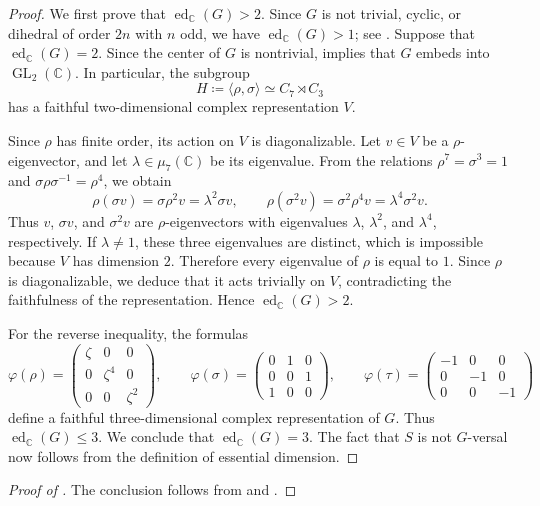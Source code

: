 \documentclass{amsart}
\theoremstyle{definition}
\theoremstyle{remark}
\numberwithin{equation}{section}
\newcommand{\C}{\mathbb C}
\newcommand{\ed}{\operatorname{ed}}
\newcommand{\ang}[1]{\langle{#1}\rangle}
\begin{document}
\begin{proof}
We first prove that $\ed_{\C}(G)>2$. Since $G$ is not trivial, cyclic, or
dihedral of order $2n$ with $n$ odd, we have $\ed_{\C}(G)>1$; see
\cite[Proposition~2.4(c) and (d)]{Duncan-ed2}. Suppose that
$\ed_{\C}(G)=2$. Since the center of $G$ is nontrivial,
\cite[Proposition~2.5]{Duncan-ed2} implies that $G$ embeds into
$\operatorname{GL}_2(\C)$. In particular, the subgroup
\[
 H\coloneqq\ang{\rho,\sigma}\simeq C_7\rtimes C_3
\]
has a faithful two-dimensional complex representation $V$.

Since $\rho$ has finite order, its action on $V$ is diagonalizable. Let $v\in V$ be a
$\rho$-eigenvector, and let $\lambda\in\mu_7(\C)$ be its eigenvalue. From the relations $\rho^7=\sigma^3=1$ and $\sigma\rho\sigma^{-1}=\rho^4$, we obtain
\[
 \rho(\sigma v)
 =\sigma\rho^2v
 =\lambda^2\sigma v,\qquad \rho(\sigma^2v)
 =\sigma^2\rho^4v
 =\lambda^4\sigma^2v.
\]
Thus $v$, $\sigma v$, and $\sigma^2v$ are $\rho$-eigenvectors with
eigenvalues $\lambda$, $\lambda^2$, and $\lambda^4$, respectively. If
$\lambda\ne1$, these three eigenvalues are distinct, which is impossible
because $V$ has dimension $2$. Therefore every eigenvalue of $\rho$ is equal to $1$.
Since $\rho$ is diagonalizable, we deduce that it acts trivially on $V$, contradicting the
faithfulness of the representation. Hence $\ed_{\C}(G)>2$.

For the reverse inequality, the formulas
\[
\varphi(\rho)=
\begin{pmatrix}
\zeta & 0 & 0\\
0 & \zeta^4 & 0\\
0 & 0 & \zeta^2
\end{pmatrix},
\qquad
\varphi(\sigma)=
\begin{pmatrix}
0 & 1 & 0\\
0 & 0 & 1\\
1 & 0 & 0
\end{pmatrix},
\qquad
\varphi(\tau)=
\begin{pmatrix}
-1 & 0 & 0\\
0 & -1 & 0\\
0 & 0 & -1
\end{pmatrix}
\]
define a faithful three-dimensional complex representation of $G$.
Thus $\ed_{\C}(G)\leq3$. We conclude that $\ed_{\C}(G)=3$. The fact that $S$ is not $G$-versal now follows from the definition of essential dimension.
\end{proof}


\begin{proof}[Proof of ]
The conclusion follows from  and
.
\end{proof}
\end{document}
